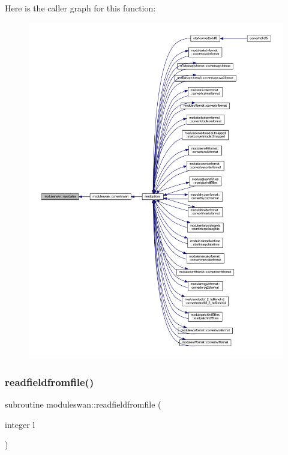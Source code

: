Here is the caller graph for this function\+:\nopagebreak
\begin{figure}[H]
\begin{center}
\leavevmode
\includegraphics[width=350pt]{namespacemoduleswan_a21f8abfb6ba4a1cd70fcffe134d3cc55_icgraph}
\end{center}
\end{figure}
\mbox{\label{namespacemoduleswan_a3ba6a86cf192c42aac83c6a40c7addbc}} 
\subsubsection{\texorpdfstring{readfieldfromfile()}{readfieldfromfile()}}
{\footnotesize\ttfamily subroutine moduleswan\+::readfieldfromfile (\begin{DoxyParamCaption}\item[{integer}]{l }\end{DoxyParamCaption})\hspace{0.3cm}{\ttfamily [private]}}

